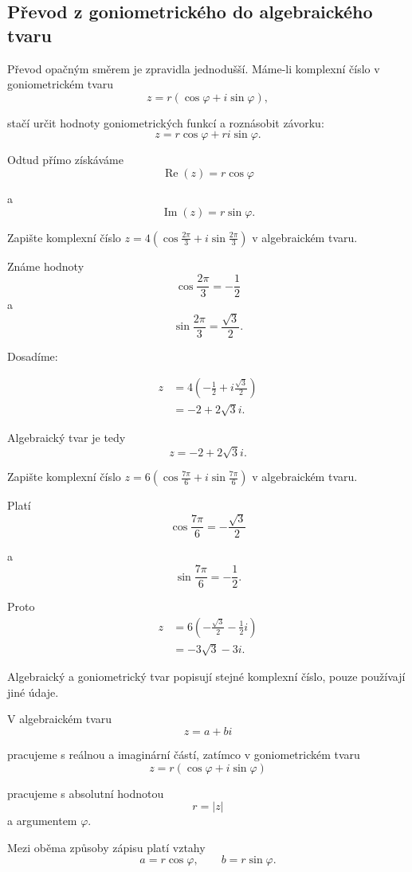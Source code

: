 \documentclass[12pt,a4paper]{article}
\begin{document}
\subsection{Převod z goniometrického do algebraického tvaru}
Převod opačným směrem je zpravidla jednodušší. 
Máme-li komplexní číslo v goniometrickém tvaru
\[
    z=r\left(\cos\varphi+i\sin\varphi\right),
\]

stačí určit hodnoty goniometrických funkcí a roznásobit závorku:
\[
    z = r\cos\varphi + ri\sin\varphi.
\]

Odtud přímo získáváme
\[
    \operatorname{Re}(z)=r\cos\varphi
\]

a
\[
    \operatorname{Im}(z)=r\sin\varphi.
\]


\begin{examplebox}
    Zapište komplexní číslo $z = 4\left(\cos\frac{2\pi}{3} + i\sin\frac{2\pi}{3}\right)$ v algebraickém tvaru.

    Známe hodnoty
    \[
        \cos\frac{2\pi}{3}=-\frac{1}{2}
    \]
    a
    \[
        \sin\frac{2\pi}{3}=\frac{\sqrt{3}}{2}.
    \]

    Dosadíme:

    \begin{align*}
        z   &= 4\left(-\frac{1}{2} + i\frac{\sqrt{3}}{2}\right) \\
            &= -2+2\sqrt{3}i.
    \end{align*}

    Algebraický tvar je tedy
    \[
        z=-2+2\sqrt{3}i.
    \]
\end{examplebox}


\begin{examplebox}
    Zapište komplexní číslo $z = 6\left(\cos\frac{7\pi}{6} + i\sin\frac{7\pi}{6}\right)$ v algebraickém tvaru.

    Platí
    \[
        \cos\frac{7\pi}{6} = -\frac{\sqrt{3}}{2}
    \]

    a
    \[
        \sin\frac{7\pi}{6} = -\frac{1}{2}.
    \]

    Proto
    \begin{align*}
        z   &= 6\left(-\frac{\sqrt{3}}{2} - \frac{1}{2}i\right)\\
            &= -3\sqrt{3}-3i.
    \end{align*}
\end{examplebox}


\begin{notebox}
    Algebraický a goniometrický tvar popisují stejné komplexní číslo, 
    pouze používají jiné údaje.

    V algebraickém tvaru
    \[
        z=a+bi
    \]

    pracujeme s reálnou a imaginární částí, zatímco v goniometrickém tvaru
    \[
        z=r\left(\cos\varphi+i\sin\varphi\right)
    \]

    pracujeme s absolutní hodnotou
    \[
        r=|z|
    \]
    a argumentem $\varphi$.

    Mezi oběma způsoby zápisu platí vztahy
    \[
        a=r\cos\varphi, \qquad b=r\sin\varphi.
    \]
\end{notebox}
\end{document}

